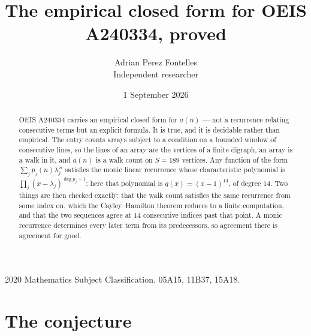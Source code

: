 \documentclass[11pt,a4paper]{article}
\title{The empirical closed form for OEIS A240334, proved}
\author{Adrian Perez Fontelles\\ \small Independent researcher}
\date{1 September 2026}
\theoremstyle{plain}
\theoremstyle{definition}
\begin{document}
\maketitle

\begin{abstract}
OEIS A240334 carries an empirical closed form for $a(n)$ --- not a recurrence relating
consecutive terms but an explicit formula. It is true, and it is decidable rather than
empirical. The entry counts arrays subject to a condition on a bounded window of consecutive lines, so the lines of an array are the
vertices of a finite digraph, an array is a walk in it, and $a(n)$ is a walk count on
$S=189$ vertices. Any function of the form $\sum_j p_j(n)\lambda_j^{\,n}$ satisfies the
monic linear recurrence whose characteristic polynomial is
$\prod_j(x-\lambda_j)^{\deg p_j+1}$; here that polynomial is $q(x)=(x-1)^{14}$, of degree
$14$. Two things are then checked exactly: that the walk count satisfies the same
recurrence from some index on, which the Cayley--Hamilton theorem reduces to a finite
computation, and that the two sequences agree at $14$ consecutive indices past that
point. A monic recurrence determines every later term from its predecessors, so agreement
there is agreement for good.
\end{abstract}

\noindent\small 2020 Mathematics Subject Classification. 05A15, 11B37, 15A18.\normalsize

\section{The conjecture}
\end{document}
